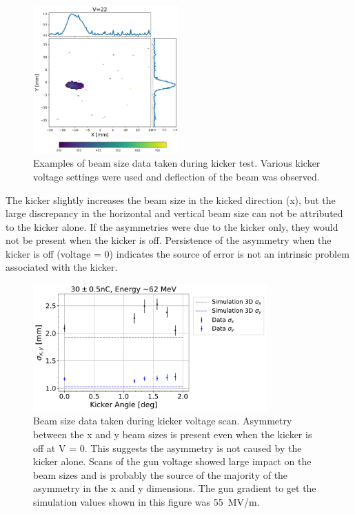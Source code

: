 \documentclass[aps,prab,preprint,groupedaddress,linenumbers]{revtex4-2}
\begin{document}
\begin{figure}
	\includegraphics[width=0.5\textwidth]{yag6_kicker_voltage22}%
	\caption{Examples of beam size data taken during kicker test. 
		Various kicker voltage settings were used and deflection of the beam was observed.}
	\label{fig:kickerbeamsize}
\end{figure}
The kicker slightly increases the beam size in the kicked direction (x), 
but the large discrepancy in the horizontal and vertical beam size can not be attributed to the kicker alone.
If the asymmetries were due to the kicker only, they would not be present when the kicker is off.
Persistence of the asymmetry when the kicker is off (voltage = 0) indicates 
the source of error is not an intrinsic problem associated with the kicker.
\begin{figure}
	\centering
	\includegraphics[width=0.8\textwidth]{xybeamsizes_high_charge_kicker_scan_angle_asymmetric}
	\caption{Beam size data taken during kicker voltage scan. Asymmetry between the x and y beam sizes
		is present even when the kicker is off at V = 0. This suggests the asymmetry is not
		caused by the kicker alone. Scans of the gun voltage showed large impact on the beam sizes
		and is probably the source of the majority of the asymmetry in the x and y dimensions.
		The gun gradient to get the simulation values shown in this figure was \SI{55}{MV/m}.} 
	\label{fig:beamsize}
\end{figure}
\end{document}
